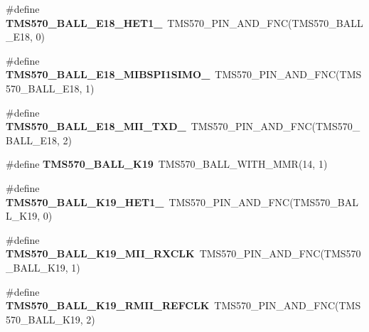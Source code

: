 \begin{DoxyCompactItemize}
\mbox{\label{tms570ls3137zwt-pins_8h_aea3d87a03d6b1aa00e4e4de6828e17ba}} 
\#define {\bfseries T\+M\+S570\+\_\+\+B\+A\+L\+L\+\_\+\+E18\+\_\+\+H\+E\+T1\+\_}~T\+M\+S570\+\_\+\+P\+I\+N\+\_\+\+A\+N\+D\+\_\+\+F\+NC(T\+M\+S570\+\_\+\+B\+A\+L\+L\+\_\+\+E18, 0)
\item 
\mbox{\label{tms570ls3137zwt-pins_8h_a010def489f696d18039a945ea8718e2a}} 
\#define {\bfseries T\+M\+S570\+\_\+\+B\+A\+L\+L\+\_\+\+E18\+\_\+\+M\+I\+B\+S\+P\+I1\+S\+I\+M\+O\+\_}~T\+M\+S570\+\_\+\+P\+I\+N\+\_\+\+A\+N\+D\+\_\+\+F\+NC(T\+M\+S570\+\_\+\+B\+A\+L\+L\+\_\+\+E18, 1)
\item 
\mbox{\label{tms570ls3137zwt-pins_8h_ad040451d2711174a4d48b1dd5d9be161}} 
\#define {\bfseries T\+M\+S570\+\_\+\+B\+A\+L\+L\+\_\+\+E18\+\_\+\+M\+I\+I\+\_\+\+T\+X\+D\+\_}~T\+M\+S570\+\_\+\+P\+I\+N\+\_\+\+A\+N\+D\+\_\+\+F\+NC(T\+M\+S570\+\_\+\+B\+A\+L\+L\+\_\+\+E18, 2)
\item 
\mbox{\label{tms570ls3137zwt-pins_8h_a28f8110f42019c9898b084e188e64c3a}} 
\#define {\bfseries T\+M\+S570\+\_\+\+B\+A\+L\+L\+\_\+\+K19}~T\+M\+S570\+\_\+\+B\+A\+L\+L\+\_\+\+W\+I\+T\+H\+\_\+\+M\+MR(14, 1)
\item 
\mbox{\label{tms570ls3137zwt-pins_8h_a64a0ef700cc79c978b7be85f8e07ae39}} 
\#define {\bfseries T\+M\+S570\+\_\+\+B\+A\+L\+L\+\_\+\+K19\+\_\+\+H\+E\+T1\+\_}~T\+M\+S570\+\_\+\+P\+I\+N\+\_\+\+A\+N\+D\+\_\+\+F\+NC(T\+M\+S570\+\_\+\+B\+A\+L\+L\+\_\+\+K19, 0)
\item 
\mbox{\label{tms570ls3137zwt-pins_8h_a068421d19c63d63a4c4091445af3f703}} 
\#define {\bfseries T\+M\+S570\+\_\+\+B\+A\+L\+L\+\_\+\+K19\+\_\+\+M\+I\+I\+\_\+\+R\+X\+C\+LK}~T\+M\+S570\+\_\+\+P\+I\+N\+\_\+\+A\+N\+D\+\_\+\+F\+NC(T\+M\+S570\+\_\+\+B\+A\+L\+L\+\_\+\+K19, 1)
\item 
\mbox{\label{tms570ls3137zwt-pins_8h_a5ace6f9b6c95502bc939ea0cf15f9a8f}} 
\#define {\bfseries T\+M\+S570\+\_\+\+B\+A\+L\+L\+\_\+\+K19\+\_\+\+R\+M\+I\+I\+\_\+\+R\+E\+F\+C\+LK}~T\+M\+S570\+\_\+\+P\+I\+N\+\_\+\+A\+N\+D\+\_\+\+F\+NC(T\+M\+S570\+\_\+\+B\+A\+L\+L\+\_\+\+K19, 2)
\item 

\end{DoxyCompactItemize}
